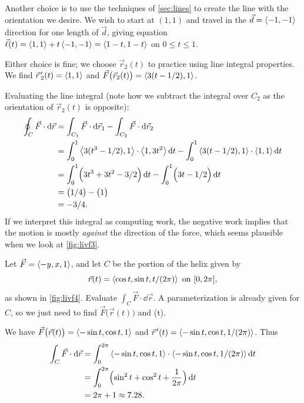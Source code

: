 \begin{example}
Another choice is to use the techniques of \autoref{sec:lines} to create the line with the orientation we desire. We wish to start at $( 1,1)$ and travel in the $\vec d =\left\langle -1,-1\right\rangle$ direction for one length of $\vec d$, giving equation $\vec \ell(t) =\left\langle 1,1\right\rangle + t\left\langle -1,-1\right\rangle =\left\langle 1-t,1-t\right\rangle$ on $0\leq t\leq 1$.

Either choice is fine; we choose $\vec r_2(t)$ to practice using line integral properties. We find $\vec r\hskip1.25pt '_2(t) =\left\langle 1,1\right\rangle$ and $\vec F\bigl(\vec r_2(t)\bigr) =\left\langle 3(t-1/2),1\right\rangle$.

Evaluating the line integral (note how we subtract the integral over $C_2$ as the orientation of $\vec r_2(t)$ is opposite):
\begin{align*}
	\oint_C \vec F\cdot\operatorname{d}\!\vec r
	&= \int_{C_1}\vec F\cdot\operatorname{d}\!\vec r_1 - \int_{C_2}\vec F\cdot\operatorname{d}\!\vec r_2 \\
	&= \int_0^1\left\langle 3(t^3-1/2),1\right\rangle\cdot\left\langle 1,3t^2\right\rangle\operatorname{d}\! t
	- \int_0^1\left\langle 3(t-1/2),1\right\rangle\cdot\left\langle 1,1\right\rangle\operatorname{d}\! t \\
	&= \int_0^1\Bigl(3t^3+3t^2-3/2\Bigr)\operatorname{d}\! t - \int_0^1 \Bigl(3t-1/2\Bigr)\operatorname{d}\! t\\
	&= \bigl(1/4 \bigr) - \bigl(1\bigr)\\
	&=	-3/4.
\end{align*}
If we interpret this integral as computing work, the negative work implies that the motion is mostly \emph{against} the direction of the force, which seems plausible when we look at \autoref{fig:livf3}.
\end{example}


\begin{example}\label{ex_livf4}%
Let $\vec F =\left\langle -y,x,1\right\rangle$, and let $C$ be the portion of the helix given by \[\vec r(t) = \left\langle  \cos t,\sin t, t/(2\pi)\right\rangle\text{ on }[0,2\pi],\]
as shown in \autoref{fig:livf4}. Evaluate $\int_C\vec F\cdot\dd\vec r$.
\solution
A parameterization is already given for $C$, so we just need to find $\vec F\bigl(\vec r(t)\bigr)$ and \vrp(t). 

We have $\vec F\bigl(\vec r(t)\bigr) =\left\langle -\sin t, \cos t, 1\right\rangle$ and $\vec r\hskip1.25pt '(t) =\left\langle -\sin t, \cos t, 1/(2\pi)\right\rangle$. Thus
\begin{align*}
	\int_C \vec F\cdot\operatorname{d}\!\vec r
	&= \int_0^{2\pi}\left\langle -\sin t, \cos t, 1\right\rangle\cdot\left\langle -\sin t, \cos t, 1/(2\pi)\right\rangle\operatorname{d}\! t\\
	&= \int_0^{2\pi} \Bigl(\sin^2t+\cos^2t + \frac1{2\pi}\Bigr)\operatorname{d}\! t\\
	&= 2\pi + 1 \approx 7.28.
\end{align*}
\end{example}

